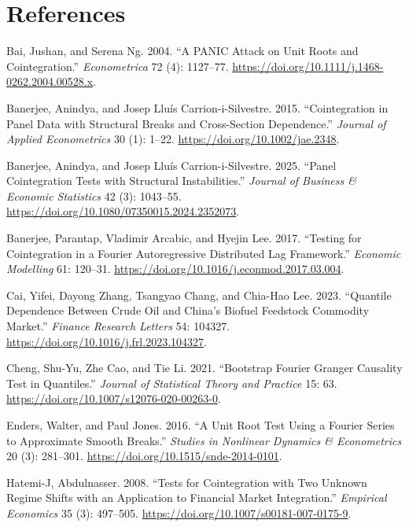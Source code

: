 \section*{References}\label{references}

\protect{}\label{refs}
\begin{CSLReferences}{1}{1}
Bai, Jushan, and Serena Ng. 2004. {``A {PANIC} Attack on Unit Roots and
Cointegration.''} \emph{Econometrica} 72 (4): 1127--77.
\url{https://doi.org/10.1111/j.1468-0262.2004.00528.x}.

Banerjee, Anindya, and Josep Lluís Carrion-i-Silvestre. 2015.
{``Cointegration in Panel Data with Structural Breaks and Cross-Section
Dependence.''} \emph{Journal of Applied Econometrics} 30 (1): 1--22.
\url{https://doi.org/10.1002/jae.2348}.

Banerjee, Anindya, and Josep Lluís Carrion-i-Silvestre. 2025. {``Panel
Cointegration Tests with Structural Instabilities.''} \emph{Journal of
Business \& Economic Statistics} 42 (3): 1043--55.
\url{https://doi.org/10.1080/07350015.2024.2352073}.

Banerjee, Parantap, Vladimir Arcabic, and Hyejin Lee. 2017. {``Testing
for Cointegration in a {Fourier} Autoregressive Distributed Lag
Framework.''} \emph{Economic Modelling} 61: 120--31.
\url{https://doi.org/10.1016/j.econmod.2017.03.004}.

Cai, Yifei, Dayong Zhang, Tsangyao Chang, and Chia-Hao Lee. 2023.
{``Quantile Dependence Between Crude Oil and {China}'s Biofuel Feedstock
Commodity Market.''} \emph{Finance Research Letters} 54: 104327.
\url{https://doi.org/10.1016/j.frl.2023.104327}.

Cheng, Shu-Yu, Zhe Cao, and Tie Li. 2021. {``Bootstrap {Fourier} Granger
Causality Test in Quantiles.''} \emph{Journal of Statistical Theory and
Practice} 15: 63. \url{https://doi.org/10.1007/s12076-020-00263-0}.

Enders, Walter, and Paul Jones. 2016. {``A Unit Root Test Using a
{Fourier} Series to Approximate Smooth Breaks.''} \emph{Studies in
Nonlinear Dynamics \& Econometrics} 20 (3): 281--301.
\url{https://doi.org/10.1515/snde-2014-0101}.

Hatemi-J, Abdulnasser. 2008. {``Tests for Cointegration with Two Unknown
Regime Shifts with an Application to Financial Market Integration.''}
\emph{Empirical Economics} 35 (3): 497--505.
\url{https://doi.org/10.1007/s00181-007-0175-9}.


\end{CSLReferences}
